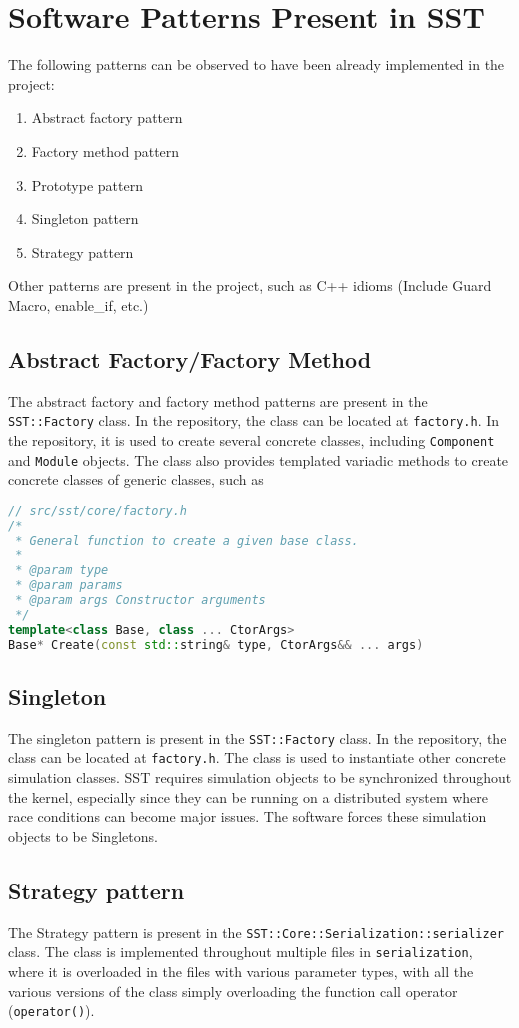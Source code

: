 
\section{Software Patterns Present in SST}
The following patterns can be observed to have been already implemented in the project:
\begin{enumerate}
    \item Abstract factory pattern
    \item Factory method pattern
    \item Prototype pattern
    \item Singleton pattern
    \item Strategy pattern
\end{enumerate}
Other patterns are present in the project, such as C++ idioms (Include Guard Macro, enable\_if, etc.)

\subsection{Abstract Factory/Factory Method}
The abstract factory and factory method patterns are present in the \texttt{SST::Factory} class. In the repository, the class can be located at \texttt{factory.h}. In the repository, it is used to create several concrete classes, including \texttt{Component} and \texttt{Module} objects. The class also provides templated variadic methods to create concrete classes of generic classes, such as
\begin{lstlisting}[language=c++]
// src/sst/core/factory.h
/*
 * General function to create a given base class.
 *
 * @param type
 * @param params
 * @param args Constructor arguments
 */
template<class Base, class ... CtorArgs>
Base* Create(const std::string& type, CtorArgs&& ... args)
\end{lstlisting}

\subsection{Singleton}
The singleton pattern is present in the \texttt{SST::Factory} class. In the repository, the class can be located at \texttt{factory.h}. The class is used to instantiate other concrete simulation classes. SST requires simulation objects to be synchronized throughout the kernel, especially since they can be running on a distributed system where race conditions can become major issues. The software forces these simulation objects to be Singletons.

\subsection{Strategy pattern}
The Strategy pattern is present in the \texttt{SST::Core::Serialization::serializer} class. The class is implemented throughout multiple files in \texttt{serialization}, where it is overloaded in the files with various parameter types, with all the various versions of the class simply overloading the function call operator (\texttt{operator()}).

